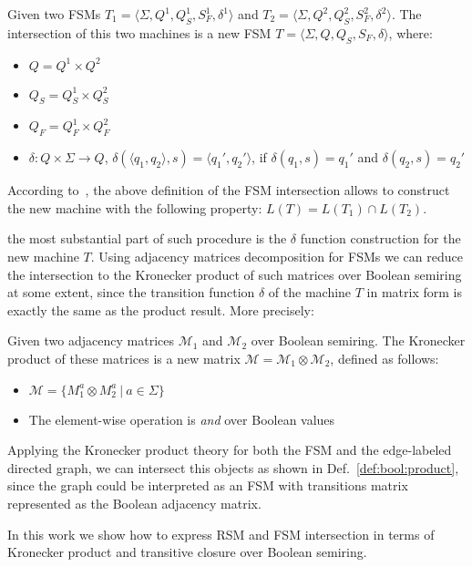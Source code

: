 \begin{definition}
\label{def:fsm:intersection}
Given two FSMs $T_1 = \langle \Sigma, Q^1, Q_S^1, S_F^1, \delta^1 \rangle$ 
and $T_2 = \langle \Sigma, Q^2, Q_S^2, S_F^2, \delta^2 \rangle$. 
The intersection of this two machines is a new FSM 
$T = \langle \Sigma, Q, Q_S, S_F, \delta \rangle$, where:
\begin{itemize}
    \item $Q = Q^1 \times Q^2$
    \item $Q_S = Q_S^1 \times Q_S^2$
    \item $Q_F = Q_F^1 \times Q_F^2$
    \item $\delta: Q \times \Sigma \to Q$, 
    $\delta (\langle q_1, q_2 \rangle, s) = \langle q_1', q_2' \rangle$, 
    \newline if $\delta(q_1,s)=q_1'$ and $\delta(q_2,s)=q_2'$
\end{itemize}
\end{definition}

According to~\cite{automata:theory:10.5555/1177300}, the above definition 
of the FSM intersection allows to construct the new machine with 
the following property: $L(T) = L(T_1) \cap L(T_2)$. 

the most substantial part of such procedure is the $\delta$ function construction 
for the new machine $T$. Using adjacency matrices decomposition for FSMs we can 
reduce the intersection to the Kronecker product of such matrices over Boolean 
semiring at some extent, since the transition function $\delta$ of the machine
$T$ in matrix form is exactly the same as the product result. More precisely:

\begin{definition}
\label{def:bool:product}
Given two adjacency matrices $\mathcal{M}_1$ and $\mathcal{M}_2$ over Boolean semiring. 
The Kronecker product of these matrices is a new matrix 
$\mathcal{M} = \mathcal{M}_1 \otimes \mathcal{M}_2$, defined as follows:
\begin{itemize}
    \item $\mathcal{M} = \{ M_1^a \otimes M_2^a~|~a \in \Sigma \}$
    \item The element-wise operation is \textit{and} over Boolean values
\end{itemize}
\end{definition}

Applying the Kronecker product theory for both the FSM and the edge-labeled directed graph,
we can intersect this objects as shown in Def.~\ref{def:bool:product}, since the 
graph could be interpreted as an FSM with transitions matrix represented as 
the Boolean adjacency matrix.

In this work we show how to express RSM and FSM intersection in terms of 
Kronecker product and transitive closure over Boolean semiring.